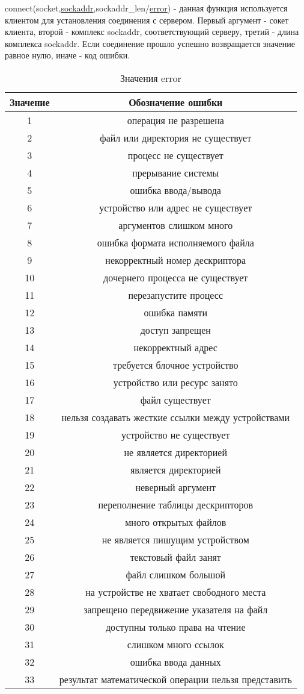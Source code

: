 \documentclass[12t]{article}
\begin{document}
\label{connect}
connect(socket,\hyperref[sockaddr]{sockaddr},sockaddr\_len/\hyperref[error]{error}) - данная функция используется клиентом для установления соединения с сервером. Первый аргумент - сокет клиента, второй - комплекс sockaddr, соответствующий серверу, третий - длина комплекса sockaddr. Если соединение прошло успешно возвращается значение равное нулю, иначе - код ошибки.

\begin{center}
\begin{longtable}{|c|c|}
\caption{\label{error}Значения error}
\\ \hline
Значение & Обозначение ошибки \\
\hline
1 & операция не разрешена \\
2 & файл или директория не существует \\
3 & процесс не существует \\
4 & прерывание системы \\
5 & ошибка ввода/вывода \\
6 & устройство или адрес не существует \\
7 & аргументов слишком много \\
8 & ошибка формата исполняемого файла \\
9 & некорректный номер дескриптора \\
10 & дочернего процесса не существует \\
11 & перезапустите процесс \\
12 & ошибка памяти \\
13 & доступ запрещен \\
14 & некорректный адрес \\
15 & требуется блочное устройство \\
16 & устройство или ресурс занято\\
17 & файл существует\\
18 & нельзя создавать жесткие ссылки между устройствами\\
19 & устройство не существует\\
20 & не является директорией\\ 
21 & является директорией\\
22 & неверный аргумент \\
23 & переполнение таблицы дескрипторов \\
24 & много открытых файлов \\
25 & не является пишущим устройством\\
26 & текстовый файл занят\\
27 & файл слишком большой \\
28 & на устройстве не хватает свободного места \\
29 & запрещено передвижение указателя на файл\\
30 & доступны только права на чтение\\
31 & слишком много ссылок\\
32 & ошибка ввода данных\\
33 & результат математической операции нельзя представить\\
\hline
\end{longtable}
\end{center}
\end{document}
